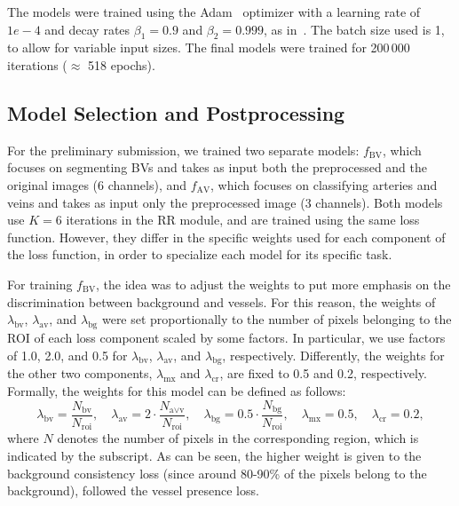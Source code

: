 \documentclass{article}
\begin{document}
The models were trained using the Adam~\cite{kingma2015adam} optimizer with a learning rate of $1e-4$ and decay rates $\beta_1 = 0.9$ and $\beta_2 = 0.999$, as in~\cite{kingma2015adam}.
The batch size used is 1, to allow for variable input sizes.
The final models were trained for 200\,000 iterations ($\approx$ 518 epochs).



\subsection{Model Selection and Postprocessing}

For the preliminary submission, we trained two separate models:
$f_\text{BV}$, which focuses on segmenting \glspl{BV} and takes as input both the preprocessed and the original images (6 channels),
and $f_\text{AV}$, which focuses on classifying arteries and veins and takes as input only the preprocessed image (3 channels).
Both models use $K=6$ iterations in the \gls{RR} module, and are trained using the same loss function.
However, they differ in the specific weights used for each component of the loss function, in order to specialize each model for its specific task.

For training $f_\text{BV}$, the idea was to adjust the weights to put more emphasis on the discrimination between background and vessels.
For this reason, the weights of $\lambda_{\text{bv}}$, $\lambda_{\text{av}}$, and $\lambda_{\text{bg}}$ were set proportionally to the number of pixels belonging to the \gls{ROI} of each loss component scaled by some factors.
In particular, we use factors of 1.0, 2.0, and 0.5 for $\lambda_{\text{bv}}$, $\lambda_{\text{av}}$, and $\lambda_{\text{bg}}$, respectively.
Differently, the weights for the other two components, $\lambda_{\text{mx}}$ and $\lambda_{\text{cr}}$, are fixed to 0.5 and 0.2, respectively.
Formally, the weights for this model can be defined as follows:
\begin{equation}
    \lambda_{\text{bv}} = \frac{N_{\text{bv}}}{N_{\text{roi}}}, \quad
    \lambda_{\text{av}} = 2 \cdot \frac{N_{\text{a}\vee\text{v}}}{N_{\text{roi}}}, \quad
    \lambda_{\text{bg}} = 0.5 \cdot \frac{N_{\text{bg}}}{N_{\text{roi}}} , \quad
    \lambda_{\text{mx}} = 0.5, \quad
    \lambda_{\text{cr}} = 0.2 ,
\end{equation}
where $N$ denotes the number of pixels in the corresponding region, which is indicated by the subscript.
As can be seen, the higher weight is given to the background consistency loss (since around 80-90\% of the pixels belong to the background), followed the vessel presence loss.
\end{document}
